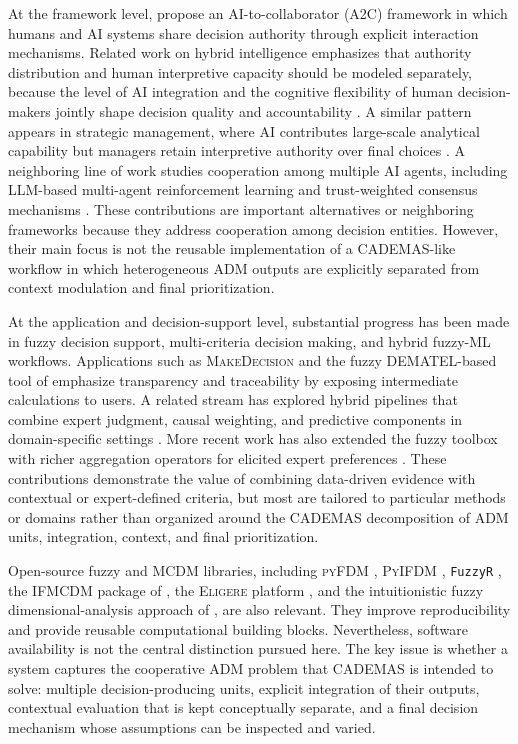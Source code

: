 \documentclass[journal,article,submit,pdftex,moreauthors,mathematics]{Definitions/mdpi}
\begin{document}
At the framework level, \citet{Tariq2024a} propose an AI-to-collaborator (A2C) framework in which humans and AI systems share decision authority through explicit interaction mechanisms. Related work on hybrid intelligence emphasizes that authority distribution and human interpretive capacity should be modeled separately, because the level of AI integration and the cognitive flexibility of human decision-makers jointly shape decision quality and accountability \citep{Deliu2026}. A similar pattern appears in strategic management, where AI contributes large-scale analytical capability but managers retain interpretive authority over final choices \citep{Telaumbanua2025}. A neighboring line of work studies cooperation among multiple AI agents, including LLM-based multi-agent reinforcement learning \citep{Sun2024,Liu2025} and trust-weighted consensus mechanisms \citep{Shakya2026}. These contributions are important alternatives or neighboring frameworks because they address cooperation among decision entities. However, their main focus is not the reusable implementation of a CADEMAS-like workflow in which heterogeneous ADM outputs are explicitly separated from context modulation and final prioritization.

At the application and decision-support level, substantial progress has been made in fuzzy decision support, multi-criteria decision making, and hybrid fuzzy-ML workflows. Applications such as \textsc{MakeDecision} \citep{Wieckowski2024} and the fuzzy DEMATEL-based tool of \citet{Chekry2024} emphasize transparency and traceability by exposing intermediate calculations to users. A related stream has explored hybrid pipelines that combine expert judgment, causal weighting, and predictive components in domain-specific settings \citep{Abdulgader2018,Sahraei2022,Ozkurt2025,Mikhaylov2026}. More recent work has also extended the fuzzy toolbox with richer aggregation operators for elicited expert preferences \citep{Suvitha2025}. These contributions demonstrate the value of combining data-driven evidence with contextual or expert-defined criteria, but most are tailored to particular methods or domains rather than organized around the CADEMAS decomposition of ADM units, integration, context, and final prioritization.

Open-source fuzzy and MCDM libraries, including \textsc{pyFDM} \citep{Wieckowski2022}, \textsc{PyIFDM} \citep{Wieckowski2023}, \texttt{FuzzyR} \citep{Chen2020}, the \textsc{IFMCDM} package of \citet{Roszkowska2024}, the \textsc{Eligere} platform \citep{Grazioso2023}, and the intuitionistic fuzzy dimensional-analysis approach of \citet{PerezDominguez2024}, are also relevant. They improve reproducibility and provide reusable computational building blocks. Nevertheless, software availability is not the central distinction pursued here. The key issue is whether a system captures the cooperative ADM problem that CADEMAS is intended to solve: multiple decision-producing units, explicit integration of their outputs, contextual evaluation that is kept conceptually separate, and a final decision mechanism whose assumptions can be inspected and varied.
\end{document}

